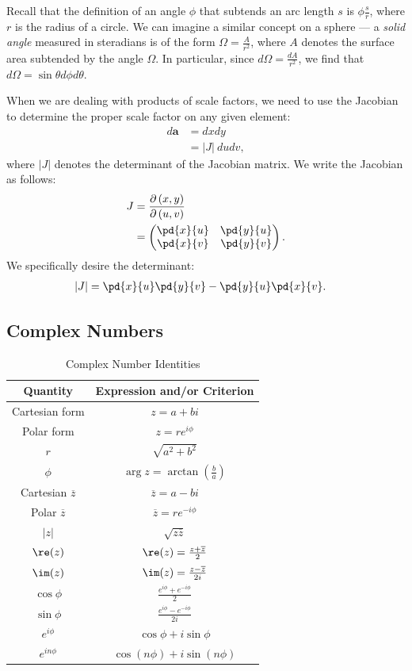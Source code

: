 \documentclass[10pt]{mypackage}
\begin{document}
Recall that the definition of an angle $\phi$ that subtends an arc length $s$ is $\phi \frac{s}{r}$, where $r$ is the radius of a circle. We can imagine a similar concept on a sphere --- a \textit{solid angle} measured in steradians is of the form $\Omega = \frac{A}{r^2}$, where $A$ denotes the surface area subtended by the angle $\Omega$. In particular, since $d\Omega = \frac{dA}{r^2}$, we find that $d\Omega = \sin\theta d\phi d\theta$.\newline

When we are dealing with products of scale factors, we need to use the Jacobian to determine the proper scale factor on any given element:
\begin{align*}
  d\mathbf{a} &= dx dy\\
              &= \left\vert J \right\vert \:du dv,
\end{align*}
where $|J|$ denotes the determinant of the Jacobian matrix. We write the Jacobian as follows:
\begin{align*}
  J &= \frac{\partial \left(x,y\right)}{\partial \left(u,v\right)}\\
    &= \begin{pmatrix}\pd{x}{u} & \pd{y}{u}\\ \pd{x}{v} & \pd{y}{v}\end{pmatrix}.
\end{align*}
We specifically desire the determinant:
\begin{align*}
  |J| &= \pd{x}{u}\pd{y}{v} - \pd{y}{u}\pd{x}{v}.
\end{align*}
\subsection{Complex Numbers}%
\begin{table}
  \centering
  \renewcommand{\arraystretch}{1.75}
  \begin{tabular}{c|c}
    Quantity & Expression and/or Criterion\\
    \hline\hline
    Cartesian form & $z = a + bi$\\
    Polar form & $z = re^{i\phi}$\\
    $r$ & $\sqrt{a^2 + b^2}$\\
    $\phi$ & $\arg z = \arctan\left(\frac{b}{a}\right)$\\
    \hline
    Cartesian $\overline{z}$ & $\overline{z} = a-bi$\\
    Polar $\overline{z}$ & $\overline{z} = re^{-i\phi}$\\
    $|z|$ & $\sqrt{z\overline{z}}$\\
    \hline
    $\re(z)$ & $\re(z) = \frac{z + \overline{z}}{2}$\\
    $\im(z)$ & $\im(z) = \frac{z - \overline{z}}{2i}$\\
    $\cos\phi$ & $\frac{e^{i\phi} + e^{-i\phi}}{2}$\\
    $\sin\phi$ & $\frac{e^{i\phi} - e^{-i\phi}}{2i}$\\
    \hline
    $e^{i\phi}$ & $\cos \phi + i\sin\phi$\\
    $e^{in\phi}$ & $\cos \left(n\phi\right) + i\sin \left(n\phi\right)$
  \end{tabular}
  \caption{Complex Number Identities}
\end{table}
\end{document}
